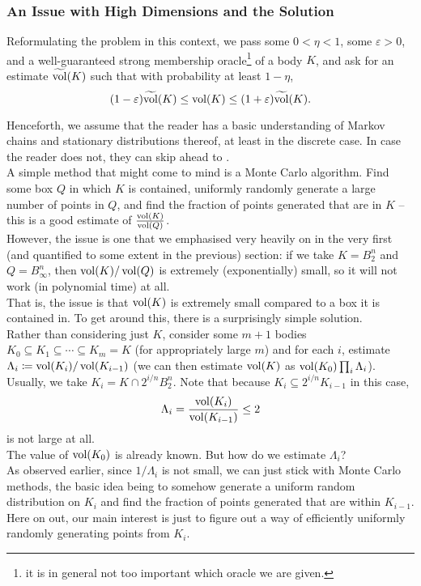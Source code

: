 \subsubsection{An Issue with High Dimensions and the Solution}

Reformulating the problem in this context, we pass some $0<\eta<1$, some $\varepsilon>0$, and a well-guaranteed strong membership oracle\footnote{it is in general not too important which oracle we are given.} of a body $K$, and ask for an estimate $\widetilde{\operatorname{vol}}(K)$ such that with probability at least $1-\eta$,
\[ (1-\varepsilon)\widetilde{\operatorname{vol}}(K) \leq \operatorname{vol}(K) \leq (1+\varepsilon)\widetilde{\operatorname{vol}}(K). \]

Henceforth, we assume that the reader has a basic understanding of Markov chains and stationary distributions thereof, at least in the discrete case. In case the reader does not, they can skip ahead to .\\

A simple method that might come to mind is a Monte Carlo algorithm. Find some box $Q$ in which $K$ is contained, uniformly randomly generate a large number of points in $Q$, and find the fraction of points generated that are in $K$ -- this is a good estimate of $\frac{\operatorname{vol}(K)}{\operatorname{vol}(Q)}$.\\
However, the issue is one that we emphasised very heavily on in the very first (and quantified to some extent in the previous) section: if we take $K=B_2^n$ and $Q=B_\infty^n$, then $\operatorname{vol}(K)/\operatorname{vol}(Q)$ is extremely (exponentially) small, so it will not work (in polynomial time) at all.\\

That is, the issue is that $\operatorname{vol}(K)$ is extremely small compared to a box it is contained in. To get around this, there is a surprisingly simple solution.\\

Rather than considering just $K$, consider some $m+1$ bodies $K_0\subseteq K_1\subseteq \cdots \subseteq K_m=K$ (for appropriately large $m$) and for each $i$, estimate $\Lambda_i \coloneqq \operatorname{vol}(K_i)/\operatorname{vol}(K_{i-1})$ (we can then estimate $\operatorname{vol}(K)$ as $\operatorname{vol}(K_0)\prod_i\Lambda_i$).\\
Usually, we take $K_i = K \cap 2^{i/n}B_2^n$. Note that because $K_{i}\subseteq 2^{i/n}K_{i-1}$ in this case,
\[ \Lambda_i = \frac{\operatorname{vol}(K_i)}{\operatorname{vol}(K_{i-1})} \leq 2 \]
is not large at all.\\
The value of $\operatorname{vol}(K_0)$ is already known. But how do we estimate $\Lambda_i$?\\
As observed earlier, since $1/\Lambda_i$ is not small, we can just stick with Monte Carlo methods, the basic idea being to somehow generate a uniform random distribution on $K_i$ and find the fraction of points generated that are within $K_{i-1}$. Here on out, our main interest is just to figure out a way of efficiently uniformly randomly generating points from $K_i$.\\

